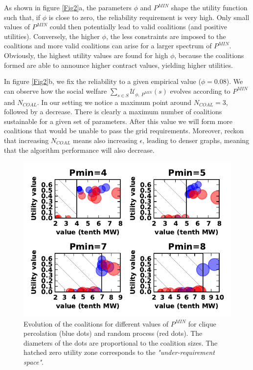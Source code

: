 \documentclass[conference]{IEEEtran}
\begin{document}
As shown in figure \ref{Fig2}a, the parameters $\phi$ and $P^{MIN}$ shape the utility function such that, if $ \phi $ is close to zero, the reliability requirement is very high. Only small values of $ P^{MIN}$ could then potentially lead to valid coalitions (and positive utilities). Conversely, the higher $\phi$, the less constraints are imposed to the coalitions and more valid coalitions can arise for a larger spectrum of $ P^{MIN}$. Obviously, the highest utility values are found for high $ \phi $, because the coalitions formed are able to announce higher contract values, yielding higher utilities. 

In figure \ref{Fig2}b, we fix the reliability to a given empirical value ($\phi = 0.08 $). We can observe how the social welfare $\sum_{s \in S} \mathcal{U}_{\phi,\ P^{MIN}}(s)$ evolves according to $P^{MIN}$ and $ N_{COAL} $. In our setting we notice a maximum point around $ N_{COAL} = 3 $, followed by a decrease. There is clearly a maximum number of coalitions sustainable for a given set of parameters. After this value we will form more coalitions that would be unable to pass the grid requirements. Moreover, reckon that increasing $ N_{COAL} $ means also increasing $ \epsilon $, leading to denser graphs, meaning that the algorithm performance will also decrease.

\begin{figure}[htbp]
  \centering
  \includegraphics[scale=0.8]{./figure5/coals}
  \caption{Evolution of the coalitions for different values of $ P^{MIN} $ for clique percolation (blue dots) and random process (red dots). The diameters of the dots are proportional to the coalition sizes. The hatched zero utility zone corresponds to the \textit{"under-requirement space"}.}
  \label{Fig3}
\end{figure}
\end{document}
